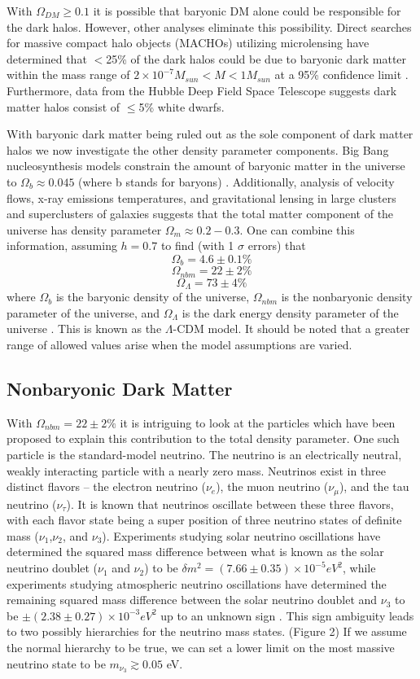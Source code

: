 \documentclass[a4paper,12pt]{article}
\begin{document}
With $\Omega_{DM} \geq 0.1$ it is possible that baryonic DM alone could be responsible for the dark halos.  However, other analyses eliminate this possibility. Direct searches for massive compact halo objects (MACHOs) utilizing microlensing have determined that $<$25\% of the dark halos could be due to baryonic dark matter within the mass range of $ 2 \times 10^{-7} M_{sun} < M < 1 M_{sun} $ at a 95\% confidence limit \cite{EROS,Alcock}. Furthermore, data from the Hubble Deep Field Space Telescope suggests dark matter halos consist of $\leq$5\% white dwarfs.

With baryonic dark matter being ruled out as the sole component of dark matter halos we now investigate the other density parameter components. Big Bang nucleosynthesis models constrain the amount of baryonic matter in the universe to $\Omega_b \approx 0.045$ (where b stands for baryons) \cite{Tytler}.  Additionally, analysis of velocity flows, x-ray emissions temperatures, and gravitational lensing in large clusters and superclusters of galaxies suggests that the total matter component of the universe has density parameter $\Omega_m \approx 0.2-0.3$.  One can combine this information, assuming $h=0.7$ to find (with 1 $\sigma$ errors) that
\[\Omega_b = 4.6 \pm 0.1\% \]
\[\Omega_{nbm} = 22 \pm 2\% \]
\[\Omega_\Lambda =73 \pm 4\% \]
where $\Omega_b$ is the baryonic density of the universe, $\Omega_{nbm}$ is the nonbaryonic density parameter of the universe, and $\Omega_\Lambda$ is the dark energy density parameter of the universe \cite{Spergel}. This is known as the $\Lambda$-CDM model.  It should be noted that a greater range of allowed values arise when the model assumptions are varied. 

\subsection{Nonbaryonic Dark Matter}

With $\Omega_{nbm} = 22 \pm 2 \% $ it is intriguing to look at the particles which have been proposed to explain this contribution to the total density parameter. One such particle is the standard-model neutrino.  The neutrino is an electrically neutral, weakly interacting particle with a nearly zero mass.  Neutrinos exist in three distinct flavors -- the electron neutrino ($\nu_e$), the muon neutrino ($\nu_\mu$), and the tau neutrino ($\nu_\tau$).  It is known that neutrinos oscillate between these three flavors, with each flavor state being a super position of three neutrino states of definite mass ($\nu_1$,$\nu_2$, and $\nu_3$).  Experiments studying solar neutrino oscillations have determined the squared mass difference between what is known as the solar neutrino doublet ($\nu_1$ and $\nu_2$) to be $\delta m^2 = (7.66 \pm 0.35) \times 10^{-5} eV^2$, while experiments studying atmospheric neutrino oscillations have determined the remaining squared mass difference between the solar neutrino doublet and $\nu_3$ to be $\pm (2.38 \pm 0.27) \times 10^{-3} eV^2$ up to an unknown sign \cite{Robertson}.  This sign ambiguity leads to two possibly hierarchies for the neutrino mass states. (Figure 2)  If we assume the normal hierarchy to be true, we can set a lower limit on the most massive neutrino state to be $ m_{\nu_3} \gtrsim 0.05$ eV.
\end{document}
